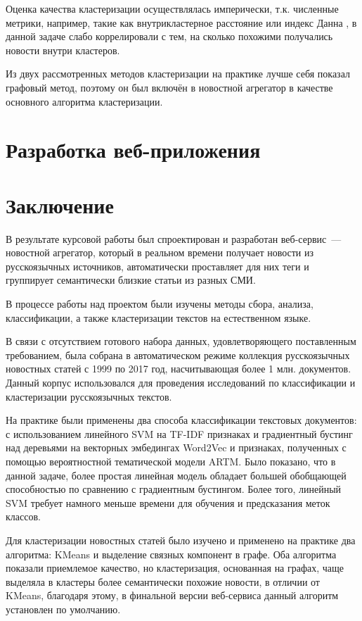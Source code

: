 \documentclass[a4paper, 14pt]{extarticle}
\begin{document}
Оценка качества кластеризации осуществлялась имперически, т.к. численные метрики, например, такие как внутрикластерное расстояние или
индекс Данна \cite{doi:10.1080/01969727308546046}, в данной задаче слабо коррелировали с тем, на сколько похожими получались новости внутри
кластеров. 

Из двух рассмотренных методов кластеризации на практике лучше себя показал графовый метод, поэтому он был включён в новостной агрегатор в качестве 
основного алгоритма кластеризации.

\section{Разработка веб-приложения}


\section{Заключение}
В результате курсовой работы был спроектирован и разработан веб-сервис~--- новостной агрегатор, который в реальном времени получает новости из
русскоязычных источников, автоматически проставляет для них теги и группирует семантически близкие статьи из разных СМИ.

В процессе работы над проектом были изучены методы сбора, анализа, классификации, а также кластеризации текстов на естественном языке.

В связи с отсутствием готового набора данных, удовлетворяющего поставленным требованием, была собрана в автоматическом режиме коллекция
русскоязычных новостных статей с 1999 по 2017 год, насчитывающая более 1 млн. документов. Данный корпус использовался
для проведения исследований по классификации и кластеризации русскоязычных текстов.

На практике были применены два способа классификации текстовых документов: с использованием линейного SVM на TF-IDF признаках и
градиентный бустинг над деревьями на векторных эмбедингах Word2Vec и признаках, полученных с помощью вероятностной тематической модели ARTM.
Было показано, что в данной задаче, более простая линейная модель обладает большей обобщающей способностью по сравнению с градиентным бустингом.
Более того, линейный SVM требует намного меньше времени для обучения и предсказания меток классов.

Для кластеризации новостных статей было изучено и применено на практике два алгоритма: KMeans и выделение связных компонент в графе.
Оба алгоритма показали приемлемое качество, но кластеризация, основанная на графах, чаще выделяла в кластеры более семантически похожие новости,
в отличии от KMeans, благодаря этому, в финальной версии веб-сервиса данный алгоритм установлен по умолчанию.
\end{document}
